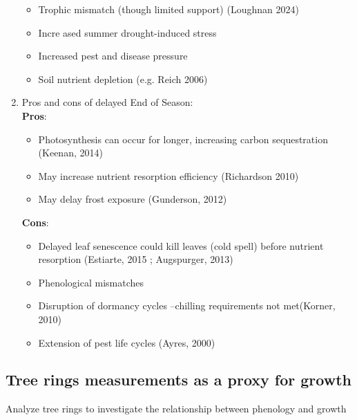 \documentclass{article}
\begin{document}
\begin{enumerate}
\begin {itemize}
				\item Trophic mismatch (though limited support) (Loughnan 2024)
				\item Incre	ased summer drought-induced stress
				\item Increased pest and disease pressure
				\item Soil nutrient depletion (e.g. Reich 2006)
			\end {itemize}
	\item Pros and cons of delayed End of Season: \\
		\textbf{Pros}: 
			\begin {itemize}
				\item Photosynthesis can occur for longer, increasing carbon sequestration (Keenan, 2014) 
				\item May increase nutrient resorption efficiency (Richardson 2010)
				\item May delay frost exposure (Gunderson, 2012)
			\end {itemize}
		\textbf{Cons}: 
			\begin {itemize}
				\item Delayed leaf senescence could kill leaves (cold spell) before nutrient resorption (Estiarte, 2015 ; Augspurger, 2013)
				\item Phenological mismatches
				\item Disruption of dormancy cycles --chilling requirements not met(Korner, 2010)
				\item Extension of pest life cycles (Ayres, 2000)
			\end {itemize}
\end{enumerate}

\subsection{Tree rings measurements as a proxy for growth}
Analyze tree rings to investigate the relationship between phenology and growth
\end{document}
